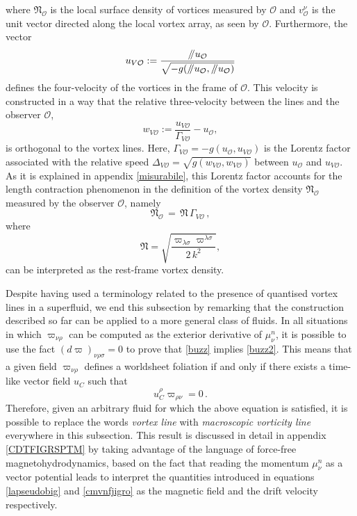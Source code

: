 \documentclass[usenatbib%
]{mnras}
\newcommand{\paral}{\mathbin{ \, \!/\mkern-5mu/\!} \,}
\begin{document}
where $\mathfrak{N}_\mathcal{O}$ is the local surface density of vortices measured by $\mathcal{O}$ and $v_\mathcal{O}^\nu$ is the unit vector directed along the local vortex array, as seen by $\mathcal{O}$. 
Furthermore, the vector
\begin{equation}\label{uvo}
u_{{V\mathcal{O}}} := \dfrac{\paral u_{\mathcal{O}}}{\sqrt{-g(\paral u_{\mathcal{O}},\paral u_{\mathcal{O}})}}
\end{equation}
defines the four-velocity of the vortices in the frame of $\mathcal{O}$. This velocity is constructed in a way that the relative three-velocity between the lines and the observer $\mathcal{O}$,
\begin{equation}\label{cmvnfjigro}
w_{V{\mathcal{O}}} := \dfrac{u_{V{\mathcal{O}}}}{\Gamma_{V{\mathcal{O}}}} - u_{\mathcal{O}}  ,
\end{equation}
is orthogonal to the vortex lines. Here,  $\Gamma_{V\mathcal{O}} = -g(u_\mathcal{O},u_{V\mathcal{O}})$ is the Lorentz factor associated with the relative speed $\Delta_{V\mathcal{O}} = \sqrt{g(w_{V{\mathcal{O}}},w_{V{\mathcal{O}}})}$ between $u_\mathcal{O}$ and $u_{V\mathcal{O}}$. 
As it is explained in appendix \ref{misurabile}, this Lorentz factor accounts for the length contraction phenomenon in the definition of the vortex density $\mathfrak{N}_\mathcal{O}$ measured by the observer $\mathcal{O}$, namely
\begin{equation}\label{bilbo}
\mathfrak{N}_\mathcal{O} \, = \, \mathfrak{N} \, \Gamma_{V{\mathcal{O}}} \, ,
\end{equation}
where
\begin{equation}
\mathfrak{N}  = \sqrt{\dfrac{\varpi_{\lambda \sigma} \varpi^{\lambda \sigma}}{2 \, k^2}},
\end{equation}
can be interpreted as the rest-frame vortex density.

Despite having used a terminology related to the presence of quantised vortex lines in a superfluid, 
we end this subsection by remarking that the construction described so far can be applied to a more general class of  fluids. %
In all situations in which $\varpi_{\nu \rho}$ can be computed as the exterior derivative of $\mu^n_\nu$, it is possible to use the fact $(d\varpi)_{\nu \rho \sigma} =0$ to prove that \eqref{buzz} implies \eqref{buzz2}.
This means that a given field  $\varpi_{\nu \rho}$ defines a worldsheet foliation if and only if there exists a time-like vector field $u_C$ such that
\begin{equation}\label{saruman}
u_C^\rho \varpi_{\rho \nu} =0 \, .
\end{equation} 
Therefore, given an arbitrary fluid for which the above equation is satisfied, it is possible to replace the words \textit{vortex line} with \textit{macroscopic vorticity line} everywhere in this subsection.
This result is discussed in detail in appendix \ref{CDTFIGRSPTM} by taking advantage of the language of force-free magnetohydrodynamics, based on the fact that reading the momentum $\mu^n_\nu$ as a vector potential leads to interpret the quantities  introduced in equations \eqref{lapseudobig} and \eqref{cmvnfjigro} as the magnetic field and the drift velocity respectively.
 
\end{document}
